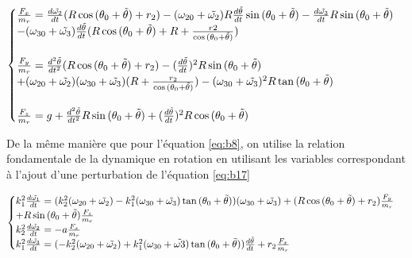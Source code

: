 \begin{equation}
  \begin{cases}

   \frac{F_x}{m_r}=\frac{d\Tilde{\omega_2}}{dt}(R\cos{(\theta_0+\Tilde{\theta})}+r_2)-(\omega_{20}+\Tilde{\omega_2})R\frac{d\Tilde{\theta}}{dt}\sin{(\theta_0+\Tilde{\theta})}-\frac{d\Tilde{\omega_3}}{dt}R  \sin{(\theta_0+\Tilde{\theta})}\\
   -(\omega_{30}+\Tilde{\omega_3})\frac{d\Tilde{\theta}}{dt}(R\cos{(\theta_0+\Tilde{\theta})}+R+\frac{r2}{\cos{(\theta_0+\Tilde{\theta})}})\\
   \\
   \frac{F_y}{m_r}=\frac{d^2\Tilde{\theta}}{dt^2}(R \cos{(\theta_0+\Tilde{\theta})}+r_2)-(\frac{d\Tilde{\theta}}{dt})^2 R\sin{(\theta_0+\Tilde{\theta})} \\
   +(\omega_{20}+\Tilde{\omega_2})(\omega_{30}+\Tilde{\omega_{3}})(R+\frac{r_2}{\cos{(\theta_0+\Tilde{\theta})}})-(\omega_{30}+\Tilde{\omega_3})^2 R \tan{(\theta_0+\Tilde{\theta})}\\
   \\
    \frac{F_z}{m_r}=g+\frac{d^2\Tilde{\theta}}{dt^2} R \sin{(\theta_0+\Tilde{\theta})} + (\frac{d\Tilde{\theta}}{dt})^2 R \cos{(\theta_0+\Tilde{\theta})}

  \end{cases}
  \label{eq:b20}
\end{equation}

De la même manière que pour l'équation \ref{eq:b8}, on utilise la relation fondamentale de la dynamique en rotation en utilisant les variables correspondant à l'ajout d'une perturbation de l'équation \ref{eq:b17}

\begin{equation}
  \begin{cases}
    k_1^2\frac{d\Tilde{\omega_1}}{dt} =(k_2^2(\omega_{20}+\Tilde{\omega_{2}})-k_1^2(\omega_{30}+\Tilde{\omega_3}) \tan{(\theta_0+\Tilde{\theta})})(\omega_{30}+\Tilde{\omega_3}) +(R\cos{(\theta_0+\Tilde{\theta})}+r_2)\frac{F_y}{m_r}\\
    + R\sin{(\theta_0+\Tilde{\theta})}\frac{F_z}{m_r} \\
    k_2^2\frac{d\Tilde{\omega_2}}{dt} =-a \frac{F_x}{m_r} \\
    k_1^2\frac{d\Tilde{\omega_3}}{dt} =(-k_2^2(\omega_{20}+\Tilde{\omega_2})+k_1^2(\omega_{30}+\Tilde{\omega3}) \tan{(\theta_0+\Tilde{\theta})})\frac{d\Tilde{\theta}}{dt} + r_2 \frac{F_x}{m_r}
  \end{cases}
  \label{eq:b21}
\end{equation}

